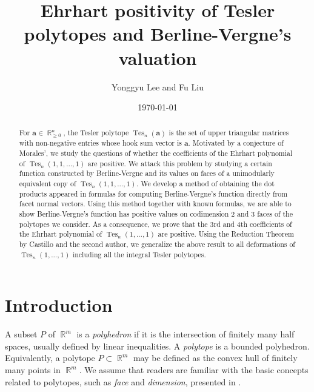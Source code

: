 \documentclass[12pt]{amsart}
\title{Ehrhart positivity of Tesler polytopes and Berline-Vergne's valuation}
\author{Yonggyu Lee and Fu Liu}
\date{\today}
\numberwithin{equation}{section}
\theoremstyle{definition}
\def\tes{\operatorname{Tes}}
\def\ba{{\boldsymbol{a}}}
\def\R{\operatorname{\mathbb{R}}}
\begin{document}
\maketitle
\begin{abstract}

  For $\ba \in \R_{\geq 0}^{n}$, the Tesler polytope $\tes_{n}(\ba)$ is the set of upper triangular matrices with non-negative entries whose hook sum vector is $\ba$. 
Motivated by a conjecture of Morales', we study the questions of whether the coefficients of the Ehrhart polynomial of $\tes_n(1,1,\dots,1)$ are positive. 
We attack this problem by studying a certain function constructed by Berline-Vergne and its values on faces of a unimodularly equivalent copy of $\tes_n(1,1,\dots,1).$ 
We develop a method of obtaining the dot products appeared in formulas for computing Berline-Vergne's function directly from facet normal vectors. Using this method together with known formulas, we are able to show Berline-Vergne's function has positive values on codimension $2$ and $3$ faces of the polytopes we consider. As a consequence, we prove that the $3$rd and $4$th coefficients of the Ehrhart polynomial of $\tes_{n}(1,\dots,1)$ are positive. Using the Reduction Theorem by Castillo and the second author, we generalize the above result to all deformations of $\tes_{n}(1,\dots,1)$ including all the integral Tesler polytopes.
\end{abstract}


\section{Introduction}
A subset $P$ of $\R^{m}$ is a \emph{polyhedron} if it is the intersection of finitely many half spaces, usually defined by linear inequalities. A \emph{polytope} is a bounded polyhedron. Equivalently, a polytope $P \subset \R^{m}$ may be defined as the convex hull of finitely many points in $\R^{m}$. We assume that readers are familiar with the basic concepts related to polytopes, such as \emph{face} and \emph{dimension}, presented in \cite{barvinok2008integer, ziegler2012lectures}. 
\end{document}
